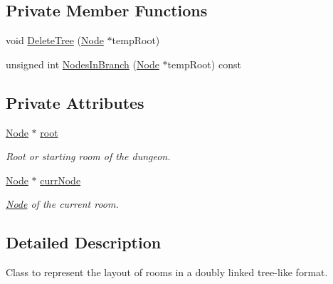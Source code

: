 \subsection*{Private Member Functions}
\begin{DoxyCompactItemize}
\item 
void \hyperlink{classRoomTree_a5e41efccc87a1c8f6826f9368121732e}{Delete\-Tree} (\hyperlink{classRoomTree_1_1Node}{Node} $\ast$temp\-Root)
\item 
unsigned int \hyperlink{classRoomTree_a0bd9fa6eed05e9fc478959a23ffef364}{Nodes\-In\-Branch} (\hyperlink{classRoomTree_1_1Node}{Node} $\ast$temp\-Root) const 
\end{DoxyCompactItemize}
\subsection*{Private Attributes}
\begin{DoxyCompactItemize}
\item 
\hyperlink{classRoomTree_1_1Node}{Node} $\ast$ \hyperlink{classRoomTree_a3e7726e562748d38e587bb20ccde6451}{root}
\begin{DoxyCompactList}\small\item\em Root or starting room of the dungeon. \end{DoxyCompactList}\item 
\hyperlink{classRoomTree_1_1Node}{Node} $\ast$ \hyperlink{classRoomTree_a1a16bf654348f42b373a3ccc742bb360}{curr\-Node}
\begin{DoxyCompactList}\small\item\em \hyperlink{classRoomTree_1_1Node}{Node} of the current room. \end{DoxyCompactList}\end{DoxyCompactItemize}


\subsection{Detailed Description}
Class to represent the layout of rooms in a doubly linked tree-\/like format. 

